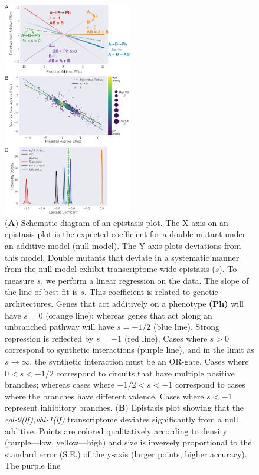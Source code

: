 \documentclass[10pt, onecolumn]{article}
\newcommand{\eglvhl}{\emph{\mbox{egl-9(lf);vhl-1(lf)}}}
\begin{document}
\begin{figure}[tbhp]
\centering
\includegraphics[width=0.5\textwidth]{../figs/egl9vhl1-epistasis.pdf}
\caption{
(\textbf{A}) Schematic diagram of an epistasis plot. The X-axis on an epistasis
plot is the expected coefficient for a double mutant under an additive model
(null model). The Y-axis plots deviations from this model. Double mutants that
deviate in a systematic manner from the null model exhibit transcriptome-wide
epistasis ($s$). To measure $s$, we perform a linear regression on the data. The
slope of the line of best fit is $s$. This coefficient is related to genetic
architectures. Genes that act additively on a phenotype \textbf{(Ph)} will have
$s=0$ (orange line); whereas genes that act along an unbranched pathway will have
$s=-1/2$ (blue line). Strong repression is reflected by $s=-1$ (red line). Cases
where $s>0$ correspond to synthetic interactions (purple line), and in the limit
as $s\rightarrow\infty$, the synthetic interaction must be an OR-gate. Cases
where $0 < s < -1/2$ correspond to circuits that have multiple positive branches;
whereas cases where $-1/2<s< -1$ correspond to cases where the branches have
different valence. Cases where $s < -1$ represent inhibitory branches.
(\textbf{B}) Epistasis plot showing
that the \eglvhl{} transcriptome deviates significantly from a null additive.
Points are colored qualitatively according to density (purple---low,
yellow---high) and size is inversely proportional to the standard
error (S.E.) of the y-axis (larger points, higher accuracy). The purple line
}
\end{figure}
\end{document}
